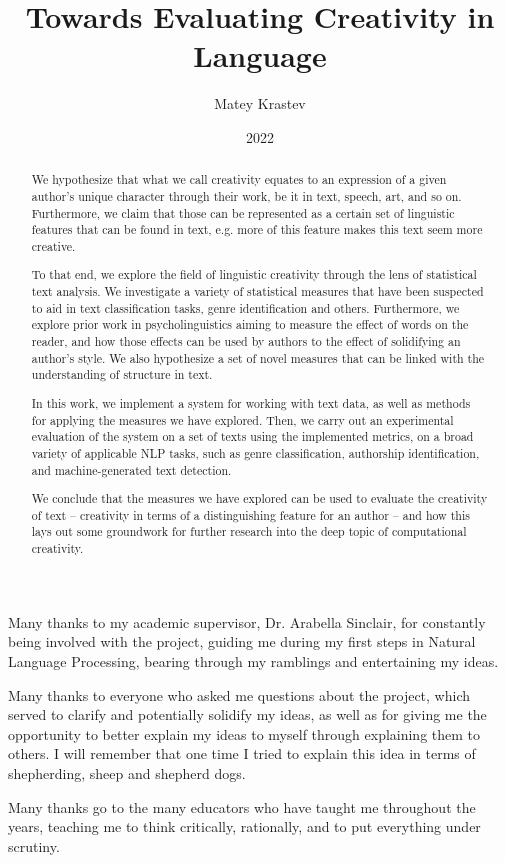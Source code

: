 \documentclass[bsc]{abdnthesis}
\title{Towards Evaluating Creativity in Language}
\author{Matey Krastev}
\date{2022}
\begin{document}
 

\maketitle
\makedeclaration

\begin{abstract}

    We hypothesize that what we call creativity equates to an expression of a given author's unique character through their work, be it in text, speech, art, and so on. Furthermore, we claim that those can be represented as a certain set of linguistic features that can be found in text, e.g. more of this feature makes this text seem more creative.

    To that end, we explore the field of linguistic creativity through the lens of statistical text analysis. We investigate a variety of statistical measures that have been suspected to aid in text classification tasks, genre identification and others. Furthermore, we explore prior work in psycholinguistics aiming to measure the effect of words on the reader, and how those effects can be used by authors to the effect of solidifying an author's style. We also hypothesize a set of novel measures that can be linked with the understanding of structure in text. 
    
    In this work, we implement a system for working with text data, as well as methods for applying the measures we have explored. Then, we carry out an experimental evaluation of the system on a set of texts using the implemented metrics, on a broad variety of applicable NLP tasks, such as genre classification, authorship identification, and machine-generated text detection. 
    
    We conclude that the measures we have explored can be used to evaluate the creativity of text -- creativity in terms of a distinguishing feature for an author -- and how this lays out some groundwork for further research into the deep topic of computational creativity.
\end{abstract}

\begin{acknowledgements}
    Many thanks to my academic supervisor, Dr. Arabella Sinclair, for constantly being involved with the project, guiding me during my first steps in Natural Language Processing, bearing through my ramblings and entertaining my ideas.

    Many thanks to everyone who asked me questions about the project, which served to clarify and potentially solidify my ideas, as well as for giving me the opportunity to better explain my ideas to myself through explaining them to others. I will remember that one time I tried to explain this idea in terms of shepherding, sheep and shepherd dogs. 
    
    Many thanks go to the many educators who have taught me throughout the years, teaching me to think critically, rationally, and to put everything under scrutiny.
\end{acknowledgements}
\end{document}
